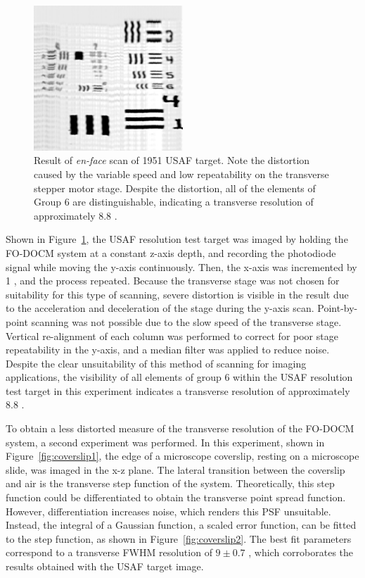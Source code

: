 \begin{figure}[h!]
\centering
\includegraphics[width=0.5\textwidth]{Images/Results/en-face-usaf.png}
\caption[Result of {\em en-face} scan of USAF target.]{Result of {\em en-face} scan of 1951 USAF target. Note the distortion caused by the variable speed and low repeatability on the transverse stepper motor stage. Despite the distortion, all of the elements of Group 6 are distinguishable, indicating a transverse resolution of approximately 8.8 \micron.\label{fig:usaf_oct}}
\end{figure}

Shown in Figure~\ref{fig:usaf_oct}, the USAF resolution test target was imaged by holding the FO-DOCM system at a constant z-axis depth, and recording the photodiode signal while moving the y-axis continuously. Then, the x-axis was incremented by 1 \micron, and the process repeated. Because the transverse stage was not chosen for suitability for this type of scanning, severe distortion is visible in the result due to the acceleration and deceleration of the stage during the y-axis scan. Point-by-point scanning was not possible due to the slow speed of the transverse stage. Vertical re-alignment of each column was performed to correct for poor stage repeatability in the y-axis, and a median filter was applied to reduce noise. Despite the clear unsuitability of this method of scanning for imaging applications, the visibility of all elements of group 6 within the USAF resolution test target in this experiment indicates a transverse resolution of approximately 8.8 \micron.

To obtain a less distorted measure of the transverse resolution of the FO-DOCM system, a second experiment was performed. In this experiment, shown in Figure~\ref{fig:coverslip1}, the edge of a microscope coverslip, resting on a microscope slide, was imaged in the x-z plane. The lateral transition between the coverslip and air is the transverse step function of the system. Theoretically, this step function could be differentiated to obtain the transverse point spread function. However, differentiation increases noise, which renders this PSF unsuitable. Instead, the integral of a Gaussian function, a scaled error function, can be fitted to the step function, as shown in Figure~\ref{fig:coverslip2}. The best fit parameters correspond to a transverse FWHM resolution of $9 \pm 0.7$ \micron, which corroborates the results obtained with the USAF target image.

